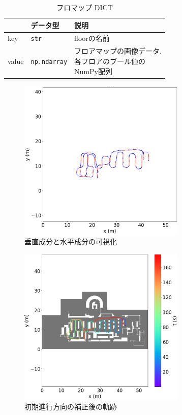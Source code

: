 \begin{table}[ht]
	\centering
	\begin{tabular}{lll}
		\hline
		      & \textbf{データ型}       & \textbf{説明}             \\ \hline
		key   & \texttt{str}        & floorの名前                \\ \hline
		value & \texttt{np.ndarray} & \makecell{フロアマップの画像データ. \\各フロアのブール値の\\NumPy配列} \\ \hline
	\end{tabular}
	\caption{フロマップ DICT}
	\label{tab:map-dict}
\end{table}

\begin{figure}[ht]
	\centering
	\includegraphics[width=80mm]{image/rb.jpg}
	\caption{垂直成分と水平成分の可視化}    \label{fig:color}
\end{figure}

\begin{figure}[ht]
	\centering
	\includegraphics[width=80mm]{image/pdr-rotate.jpg}
	\caption{初期進行方向の補正後の軌跡}    \label{fig:pdr-rotate}
\end{figure}
